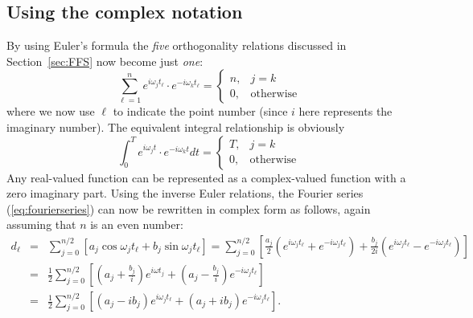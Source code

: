\subsection{Using the complex notation}
By using Euler's formula the \emph{five} orthogonality relations discussed in Section~\ref{sec:FFS} now become just \emph{one}:
\begin{equation}
\sum^n_{\ell=1} e^{i \omega_j t_{\ell}} \cdot e^{-i \omega_k t_{\ell}} =
\left \{ \begin{array}{cc}
n, & j=k \\[12pt]
0, & \mbox{otherwise}
\end{array} \right.
\label{eq:DA2_16.8}
\end{equation}
where we now use $\ell$ to indicate the point number (since $i$ here represents the imaginary number).
The equivalent integral relationship is obviously
\begin{equation}
\int^T_{0} e^{i \omega_j t} \cdot e^{-i \omega_k t} dt =
\left \{ \begin{array}{cc}
T, & j=k \\[12pt]
0, & \mbox{otherwise}
\end{array} \right.
\label{eq:orthocomplex}
\end{equation}
Any real-valued function can be represented as a complex-valued function with a zero
imaginary part.
Using the inverse Euler relations, the Fourier series (\ref{eq:fourierseries}) can now be rewritten in complex form
as follows, again assuming that $n$ is an even number:
\begin{equation}
\begin{array}{rcl}
d_{\ell} & = & \displaystyle \sum^{n/2}_{j=0} \left [ a_j \cos \omega_j t_{\ell} + b_j \sin \omega_j t_{\ell} \right] =
\displaystyle \sum^{n/2}_{j=0}
\left [ \frac{a_j}{2} \left (e^{i\omega_j t_{\ell}} + e^{-i\omega_j t_{\ell}} \right ) +
\frac{b_j}{2i} \left (e^{i\omega_j t_{\ell}} - e^{-i\omega_j t_{\ell}} \right ) \right] \\[14pt]
& = & \frac{1}{2}\displaystyle \sum^{n/2}_{j=0} \left [\left (a_j + \frac{b_j}{i} \right) e^{i\omega t_j}
+ \left (a_j - \frac{b_j}{i} \right ) e^{- i \omega_j t_{\ell}} \right ] \\[14pt]
& = & \displaystyle \frac{1}{2} \sum^{n/2}_{j=0} \left [ \left (a_j - ib_j \right ) e^{i \omega_j t_{\ell}} + \left (a_j + ib_j \right)
e^{-i \omega_j t_{\ell}} \right ].
\end{array}
\label{eq:DA2_16.10}
\end{equation}
